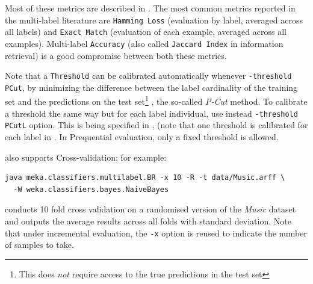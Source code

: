 \documentclass[11pt]{article}
\newcommand{\MEKA}{Meka}
\begin{document}
Most of these metrics are described in \cite{ECC2,MMD}. The most common metrics reported in the multi-label literature are \texttt{Hamming Loss} (evaluation by label, averaged across all labels) and \texttt{Exact Match} (evaluation of each example, averaged across all examples). Multi-label \texttt{Accuracy} (also called \texttt{Jaccard Index} in information retrieval) is a good compromise between both these metrics.


Note that a \texttt{Threshold} can be calibrated automatically whenever \texttt{-threshold PCut}, by minimizing the difference between the label cardinality of the training set and the predictions on the test set\footnote{This does \emph{not} require access to the true predictions in the test set} \cite{ECC2}, the so-called \textit{P-Cut} method. To calibrate a threshold the same way but for each label individual, use instead \texttt{-threshold PCutL} option. This is being specified in , (note that one threshold is calibrated for each label in . In \textsf{Prequential} evaluation, only a fixed threshold is allowed.


\framework{\MEKA} also supports \textsf{Cross-validation}; for example:
\begin{lstlisting}
java meka.classifiers.multilabel.BR -x 10 -R -t data/Music.arff \
  -W weka.classifiers.bayes.NaiveBayes
\end{lstlisting}
conducts 10 fold cross validation on a randomised version of the \textit{Music} dataset and outputs the average results across all folds with standard deviation. Note that under incremental evaluation, the \texttt{-x} option is reused to indicate the number of samples to take. %
\end{document}
